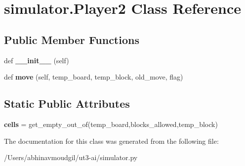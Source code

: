 \hypertarget{classsimulator_1_1_player2}{}\section{simulator.\+Player2 Class Reference}
\label{classsimulator_1_1_player2}
\subsection*{Public Member Functions}
\begin{DoxyCompactItemize}
\item 
def {\bfseries \+\_\+\+\_\+init\+\_\+\+\_\+} (self)\hypertarget{classsimulator_1_1_player2_a11323b9675fca456c353ef27423d8e6e}{}\label{classsimulator_1_1_player2_a11323b9675fca456c353ef27423d8e6e}

\item 
def {\bfseries move} (self, temp\+\_\+board, temp\+\_\+block, old\+\_\+move, flag)\hypertarget{classsimulator_1_1_player2_a2b8c0b33bac443b650d67b7ed9d3cf40}{}\label{classsimulator_1_1_player2_a2b8c0b33bac443b650d67b7ed9d3cf40}

\end{DoxyCompactItemize}
\subsection*{Static Public Attributes}
\begin{DoxyCompactItemize}
\item 
{\bfseries cells} = get\+\_\+empty\+\_\+out\+\_\+of(temp\+\_\+board,blocks\+\_\+allowed,temp\+\_\+block)\hypertarget{classsimulator_1_1_player2_a4dd86490ce0d9295470db52ce7160159}{}\label{classsimulator_1_1_player2_a4dd86490ce0d9295470db52ce7160159}

\end{DoxyCompactItemize}


The documentation for this class was generated from the following file\+:\begin{DoxyCompactItemize}
\item 
/\+Users/abhinavmoudgil/ut3-\/ai/simulator.\+py\end{DoxyCompactItemize}

